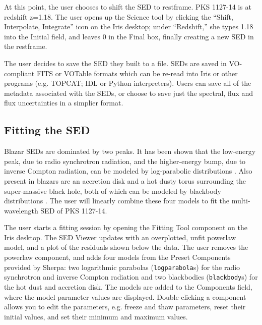 At this point, the user chooses to shift the SED to restframe. PKS 1127-14 is at redshift z=1.18. The user opens up the Science tool by clicking the ``Shift, Interpolate, Integrate'' icon on the Iris desktop; under ``Redshift,'' she types 1.18 into the Initial field, and leaves 0 in the Final box, finally creating a new SED in the restframe.

The user decides to save the SED they built to a file. SEDs are saved in VO-compliant FITS or VOTable formats which can be re-read into Iris or other programs (e.g. TOPCAT; IDL or Python interpreters). Users can save all of the metadata associated with the SEDs, or choose to save just the spectral, flux and flux uncertainties in a simplier format.

\subsection{Fitting the SED}

Blazar SEDs are dominated by two peaks. It has been shown that the low-energy peak, due to radio synchrotron radiation, and the higher-energy bump, due to inverse Compton radiation, can be modeled by log-parabolic distributions \citep{2006A&A...448..861M,2009A&A...501..879T}. Also present in blazars are an accretion disk and a hot dusty torus surrounding the super-massive black hole, both of which can be modeled by blackbody distributions \citep{2002ApJ...575..667D}. The user will linearly combine these four models to fit the multi-wavelength SED of PKS 1127-14.  

The user starts a fitting session by opening the Fitting Tool component on the Iris desktop. The SED Viewer updates with an overplotted, unfit powerlaw model, and a plot of the residuals shown below the data. The user removes the powerlaw component, and adds four models from the Preset Components provided by Sherpa: two logarithmic parabolas (\texttt{logparabola}s) for the radio synchrotron and inverse Compton radiation and two blackbodies (\texttt{blackbody}s) for the hot dust and accretion disk. The models are added to the Components field, where the model parameter values are displayed. Double-clicking a component allows you to edit the parameters, e.g. freeze and thaw parameters, reset their initial values, and set their minimum and maximum values. 

